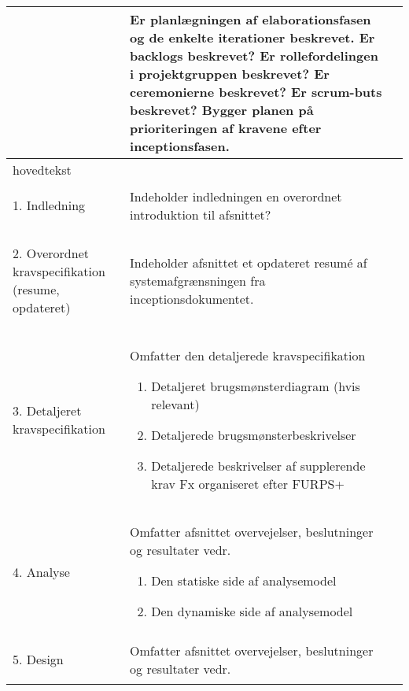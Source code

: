 \begin{center}
\begin{longtable}{|m{3.5cm}|m{10cm}|m{2.5cm}|}
& Er planlægningen af elaborationsfasen og de enkelte iterationer beskrevet.\newline
Er backlogs beskrevet?\newline
Er rollefordelingen i projektgruppen beskrevet?\newline
Er ceremonierne beskrevet?\newline
Er scrum-buts beskrevet?\newline
Bygger planen på prioriteringen af kravene efter inceptionsfasen. & \\
\hline
hovedtekst & & \\ \hline
\begin{flushright}
1. Indledning
\end{flushright} & Indeholder indledningen en overordnet introduktion til afsnittet? &\\ \hline
\begin{flushright}
2. Overordnet kravspecifikation (resume, opdateret)
\end{flushright} & Indeholder afsnittet et opdateret resumé  af systemafgrænsningen fra inceptionsdokumentet. & \\ \hline
\begin{flushright}
3. Detaljeret kravspecifikation
\end{flushright} & 
Omfatter den detaljerede kravspecifikation \newline
\begin{enumerate}
\item Detaljeret brugsmønsterdiagram (hvis relevant)
\item Detaljerede brugsmønsterbeskrivelser 
\item Detaljerede beskrivelser af supplerende krav Fx organiseret efter FURPS+
\end{enumerate}
& \\
\hline
\begin{flushright}
4. Analyse
\end{flushright}
& Omfatter afsnittet overvejelser, beslutninger og resultater vedr. \newline
\begin{enumerate}
\item Den statiske side af analysemodel
\item Den dynamiske side af analysemodel
\end{enumerate}
& \\ \hline
\begin{flushright}
5. Design 
\end{flushright}
& Omfatter afsnittet overvejelser, beslutninger og resultater vedr. \newline

\end{longtable}
\end{center}
